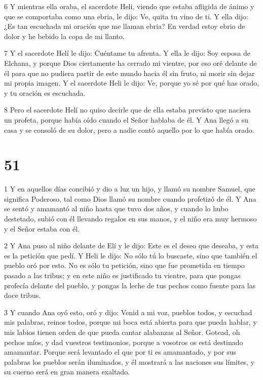 \par 6 Y mientras ella oraba, el sacerdote Heli, viendo que estaba afligida de ánimo y que se comportaba como una ebria, le dijo: Ve, quita tu vino de ti. Y ella dijo: ¿Es tan escuchada mi oración que me llaman ebria? En verdad estoy ebrio de dolor y he bebido la copa de mi llanto.

\par 7 Y el sacerdote Helí le dijo: Cuéntame tu afrenta. Y ella le dijo: Soy esposa de Elchana, y porque Dios ciertamente ha cerrado mi vientre, por eso oré delante de él para que no pudiera partir de este mundo hacia él sin fruto, ni morir sin dejar mi propia imagen. Y el sacerdote Heli le dijo: Ve, porque yo sé por qué has orado, y tu oración es escuchada.

\par 8 Pero el sacerdote Helí no quiso decirle que de ella estaba previsto que naciera un profeta, porque había oído cuando el Señor hablaba de él. Y Ana llegó a su casa y se consoló de su dolor, pero a nadie contó aquello por lo que había orado.

\chapter{51}

\par 1 Y en aquellos días concibió y dio a luz un hijo, y llamó su nombre Samuel, que significa Poderoso, tal como Dios llamó su nombre cuando profetizó de él. Y Ana se sentó y amamantó al niño hasta que tuvo dos años, y cuando lo hubo destetado, subió con él llevando regalos en sus manos, y el niño era muy hermoso y el Señor estaba con él.

\par 2 Y Ana puso al niño delante de Elí y le dijo: Este es el deseo que deseaba, y esta es la petición que pedí. Y Heli le dijo: No sólo tú lo buscaste, sino que también el pueblo oró por esto. No es sólo tu petición, sino que fue prometida en tiempo pasado a las tribus; y en este niño es justificado tu vientre, para que pongas profecía delante del pueblo, y pongas la leche de tus pechos como fuente para las doce tribus.

\par 3 Y cuando Ana oyó esto, oró y dijo: Venid a mi voz, pueblos todos, y escuchad mis palabras, reinos todos, porque mi boca está abierta para que pueda hablar, y mis labios tienen orden de que pueda cantar alabanzas al Señor. Gotead, oh pechos míos, y dad vuestros testimonios, porque a vosotros os está destinado amamantar. Porque será levantado el que por ti es amamantado, y por sus palabras los pueblos serán iluminados, y él mostrará a las naciones sus límites, y su cuerno será en gran manera exaltado.

